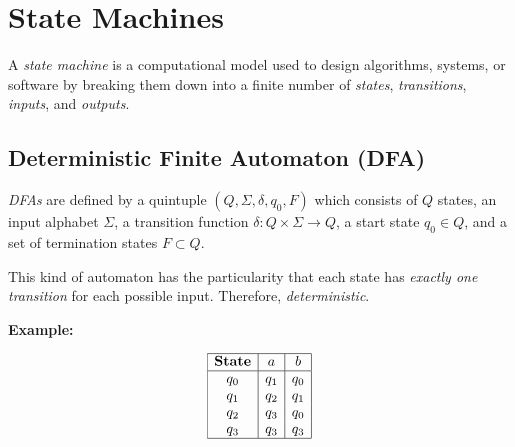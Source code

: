 \chapter{State Machines}

A \emph{state machine} is a computational model used to design algorithms, systems, or software by breaking them down into a finite number of \emph{states}, 
\emph{transitions}, \emph{inputs}, and \emph{outputs}.  

\section{Deterministic Finite Automaton (DFA)}  

\emph{DFAs} are defined by a quintuple \((Q, \Sigma, \delta, q_0, F)\) which consists of \(Q\) states, 
an input alphabet \(\Sigma\), a transition function \(\delta: Q \times \Sigma \to Q\), a start state \(q_0 \in Q\), and a set of 
termination states \(F \subset Q\).

This kind of automaton has the particularity that each state has \emph{exactly one transition} for 
each possible input. Therefore, \emph{deterministic}.

\textbf{Example:}

\[
    \begin{array}{|c|c|c|}
    \hline
    \textbf{State} & a & b \\
    \hline
    q_0 & q_1 & q_0 \\
    q_1 & q_2 & q_1 \\
    q_2 & q_3 & q_0 \\
    q_3 & q_3 & q_3 \\
    \hline
    \end{array}
\]
\begin{center}
\end{center}

